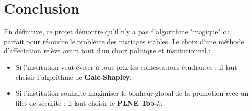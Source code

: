 \documentclass{article}
\begin{document}
\section{Conclusion}

En définitive, ce projet démontre qu'il n'y a pas d'algorithme "magique" ou parfait pour résoudre le problème des mariages stables. Le choix d'une méthode d'affectation relève avant tout d'un choix politique et institutionnel :

\begin{itemize}
    \item Si l'institution veut éviter à tout prix les contestations étudiantes : il faut choisir l'algorithme de \textbf{Gale-Shapley}.
    \item Si l'institution souhaite maximiser le bonheur global de la promotion avec un filet de sécurité : il faut choisir le \textbf{PLNE Top-$k$}.
\end{itemize}
\end{document}

